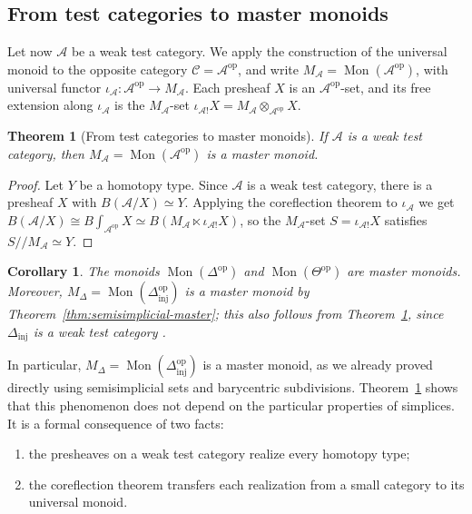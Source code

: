\documentclass[11pt]{amsart}
\newtheorem{theorem}[teo]{Theorem}
\newtheorem{corollary}[teo]{Corollary}
\theoremstyle{definition}
\theoremstyle{remark}
\numberwithin{figure}{section}%
\newcommand{\CC}{\mathcal{C}}
\DeclareMathOperator{\Mon}{Mon}
\newcommand{\Dinj}{\Delta_{\mathrm{inj}}}
\newcommand{\op}{\mathrm{op}}
\newcommand{\A}{\mathcal{A}}
\begin{document}
\subsection{From test categories to master monoids}
\label{subsec:from-test-to-master}

Let now $\A$ be a weak test category. We apply the construction of the universal monoid to the opposite category $\CC=\A^{\op}$, and write $M_\A=\Mon(\A^{\op})$, with universal functor $\iota_\A\colon\A^{\op}\to M_\A$. Each presheaf $X$ is an $\A^{\op}$-set, and its free extension along $\iota_\A$ is the $M_\A$-set $\iota_{\A!}X=M_\A\otimes_{\A^{\op}}X$.

\begin{theorem}[From test categories to master monoids]
\label{thm:test-category-master-monoid}
If $\A$ is a weak test category, then $M_\A=\Mon(\A^{\op})$ is a master monoid.
\end{theorem}

\begin{proof}
Let $Y$ be a homotopy type. Since $\A$ is a weak test category, there is a presheaf $X$ with $B(\A/X)\simeq Y$. Applying the coreflection theorem to $\iota_\A$ we get $B(\A/X)\cong B\!\int_{\A^{\op}}X\simeq B(M_\A\ltimes\iota_{\A!}X)$, so the $M_\A$-set $S=\iota_{\A!}X$ satisfies $S/\!/M_\A\simeq Y$.
\end{proof}

\begin{corollary}
\label{cor:test-master-examples}
The monoids $\Mon(\Delta^{\op})$ and $\Mon(\Theta^{\op})$ are master monoids. Moreover, $M_\Delta=\Mon(\Dinj^{\op})$ is a master monoid by Theorem~\ref{thm:semisimplicial-master}; this also follows from Theorem~\ref{thm:test-category-master-monoid}, since $\Dinj$ is a weak test category \cite[Prop.~1.7.25]{Malt}.
\end{corollary}

In particular, $M_\Delta=\Mon(\Dinj^{\op})$ is a master monoid, as we already proved directly using semisimplicial sets and barycentric subdivisions. Theorem~\ref{thm:test-category-master-monoid} shows that this phenomenon does not depend on the particular properties of simplices. It is a formal consequence of two facts:
\begin{enumerate}
\item the presheaves on a weak test category realize every homotopy type;
\item the coreflection theorem transfers each realization from a small category to its universal monoid.
\end{enumerate}
\end{document}
